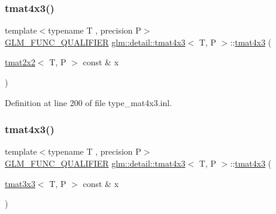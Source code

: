 \mbox{\label{structglm_1_1detail_1_1tmat4x3_a15e5f3c44fc8d0b02c1a507e740d2359}} 
\subsubsection{\texorpdfstring{tmat4x3()}{tmat4x3()}\hspace{0.1cm}{\footnotesize\ttfamily [11/22]}}
{\footnotesize\ttfamily template$<$typename T , precision P$>$ \\
\hyperlink{setup_8hpp_a33fdea6f91c5f834105f7415e2a64407}{G\+L\+M\+\_\+\+F\+U\+N\+C\+\_\+\+Q\+U\+A\+L\+I\+F\+I\+ER} \hyperlink{structglm_1_1detail_1_1tmat4x3}{glm\+::detail\+::tmat4x3}$<$ T, P $>$\+::\hyperlink{structglm_1_1detail_1_1tmat4x3}{tmat4x3} (\begin{DoxyParamCaption}\item[{\hyperlink{structglm_1_1detail_1_1tmat2x2}{tmat2x2}$<$ T, P $>$ const \&}]{x }\end{DoxyParamCaption})\hspace{0.3cm}{\ttfamily [explicit]}}



Definition at line 200 of file type\+\_\+mat4x3.\+inl.

\mbox{\label{structglm_1_1detail_1_1tmat4x3_a285348e37aea9e646a928c084090999f}} 
\subsubsection{\texorpdfstring{tmat4x3()}{tmat4x3()}\hspace{0.1cm}{\footnotesize\ttfamily [12/22]}}
{\footnotesize\ttfamily template$<$typename T , precision P$>$ \\
\hyperlink{setup_8hpp_a33fdea6f91c5f834105f7415e2a64407}{G\+L\+M\+\_\+\+F\+U\+N\+C\+\_\+\+Q\+U\+A\+L\+I\+F\+I\+ER} \hyperlink{structglm_1_1detail_1_1tmat4x3}{glm\+::detail\+::tmat4x3}$<$ T, P $>$\+::\hyperlink{structglm_1_1detail_1_1tmat4x3}{tmat4x3} (\begin{DoxyParamCaption}\item[{\hyperlink{structglm_1_1detail_1_1tmat3x3}{tmat3x3}$<$ T, P $>$ const \&}]{x }\end{DoxyParamCaption})\hspace{0.3cm}{\ttfamily [explicit]}}



